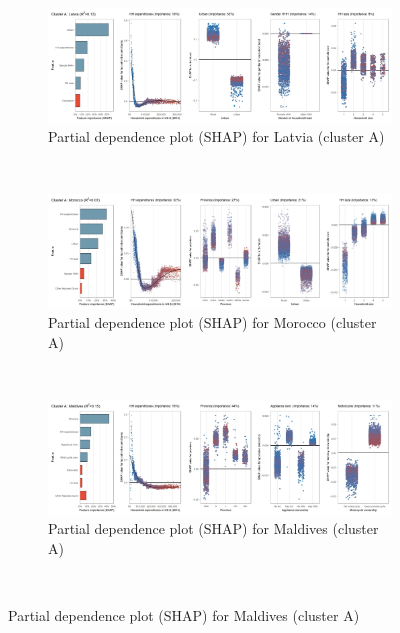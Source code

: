 \begin{figure}[ht!]\ContinuedFloat
    \centering
   \begin{subfigure}[b]{\textwidth}
    \centering
         \caption{Partial dependence plot (SHAP) for Latvia (cluster A)}
         \label{fig:5b_LVA}
         \includegraphics[width=\textwidth]{Figure 5b/Figure_5b_LVA}     
         \end{subfigure}
    \\
    \vspace{0.5cm}
    \begin{subfigure}[b]{\textwidth}
    \centering
         \caption{Partial dependence plot (SHAP) for Morocco (cluster A)}
         \label{fig:5b_MAR}
         \includegraphics[width=\textwidth]{Figure 5b/Figure_5b_MAR}     
     \end{subfigure}
    \\
    \vspace{0.5cm}
   \begin{subfigure}[b]{\textwidth}
    \centering
         \caption{Partial dependence plot (SHAP) for Maldives (cluster A)}
         \label{fig:5b_MDV}
         \includegraphics[width=\textwidth]{Figure 5b/Figure_5b_MDV}     
         \end{subfigure}
    \\
    \vspace{0.5cm}
   

\end{figure}
